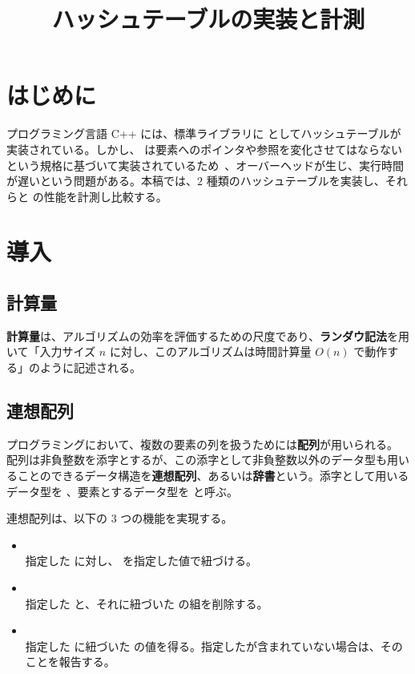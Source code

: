 \documentclass[dvipdfmx,a4j,10pt]{jarticle}
\begin{document}
\title{ハッシュテーブルの実装と計測}
\date{}
\maketitle

\section{はじめに}

プログラミング言語 C++ には、標準ライブラリに  としてハッシュテーブルが実装されている。しかし、 は要素へのポインタや参照を変化させてはならないという規格に基づいて実装されているため~\cite{C++Draft}、オーバーヘッドが生じ、実行時間が遅いという問題がある。本稿では、$2$ 種類のハッシュテーブルを実装し、それらと  の性能を計測し比較する。

\section{導入}

\subsection{計算量}

\textbf{計算量}は、アルゴリズムの効率を評価するための尺度であり、\textbf{ランダウ記法}を用いて「入力サイズ $n$ に対し、このアルゴリズムは時間計算量 $O(n)$ で動作する」のように記述される。

\subsection{連想配列}

プログラミングにおいて、複数の要素の列を扱うためには\textbf{配列}が用いられる。
配列は非負整数を添字とするが、この添字として非負整数以外のデータ型も用いることのできるデータ構造を\textbf{連想配列}、あるいは\textbf{辞書}という。添字として用いるデータ型を 、要素とするデータ型を  と呼ぶ。

連想配列は、以下の $3$ つの機能を実現する。

\begin{itemize}
  \item {} \mbox{}\\ 指定した  に対し、 を指定した値で紐づける。
  \item {} \mbox{}\\ 指定した  と、それに紐づいた  の組を削除する。
  \item {} \mbox{}\\ 指定した  に紐づいた  の値を得る。指定したが含まれていない場合は、そのことを報告する。
\end{itemize}
\end{document}
